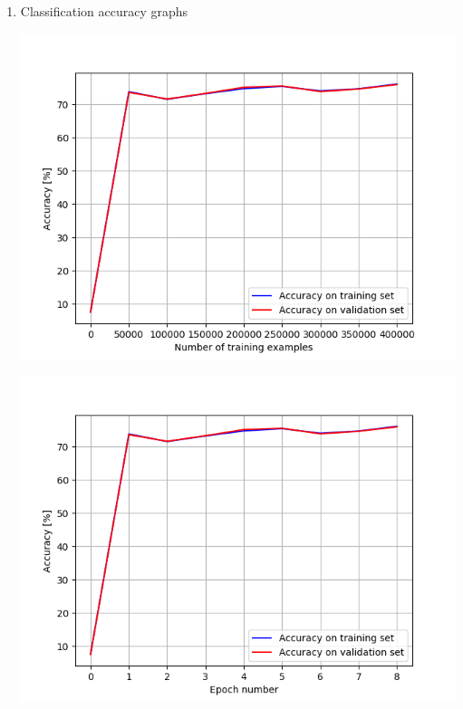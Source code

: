 \documentclass[a4paper]{iacas}
\begin{document}
\begin{enumerate}
\begin{enumerate}
\item Classification accuracy graphs

\vskip 0.1in
\begin{minipage}{\linewidth}
	\includegraphics[scale=0.8]{hw2_py/results/_14_01_43/lr_0_1_net_1_CE_/accuracy.png}
	\label{fig_7}
\end{minipage}
\vskip 0.1in
\begin{minipage}{\linewidth}
	\includegraphics[scale=0.8]{hw2_py/results/_14_01_43/lr_0_1_net_1_CE_/accuracy_epoch.png}
	\label{fig_8}
\end{minipage}
\vskip 0.1in







\end{enumerate}
\end{enumerate}
\end{document}
